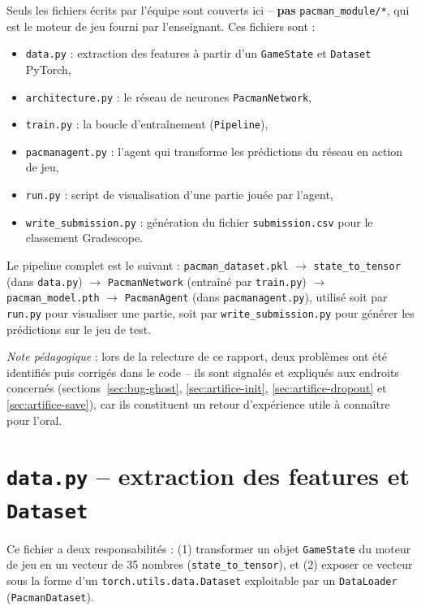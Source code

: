 \documentclass[a4paper,12pt]{article}
\begin{document}
Seuls les fichiers écrits par l'équipe sont couverts ici -- \textbf{pas}
\texttt{pacman\_module/*}, qui est le moteur de jeu fourni par
l'enseignant. Ces fichiers sont :

\begin{itemize}
    \item \texttt{data.py} : extraction des features à partir d'un
    \texttt{GameState} et \texttt{Dataset} PyTorch,
    \item \texttt{architecture.py} : le réseau de neurones
    \texttt{PacmanNetwork},
    \item \texttt{train.py} : la boucle d'entraînement (\texttt{Pipeline}),
    \item \texttt{pacmanagent.py} : l'agent qui transforme les prédictions
    du réseau en action de jeu,
    \item \texttt{run.py} : script de visualisation d'une partie jouée par
    l'agent,
    \item \texttt{write\_submission.py} : génération du fichier
    \texttt{submission.csv} pour le classement Gradescope.
\end{itemize}

Le pipeline complet est le suivant :
\texttt{pacman\_dataset.pkl} $\rightarrow$ \texttt{state\_to\_tensor}
(dans \texttt{data.py}) $\rightarrow$ \texttt{PacmanNetwork} (entraîné par
\texttt{train.py}) $\rightarrow$ \texttt{pacman\_model.pth}
$\rightarrow$ \texttt{PacmanAgent} (dans \texttt{pacmanagent.py}), utilisé
soit par \texttt{run.py} pour visualiser une partie, soit par
\texttt{write\_submission.py} pour générer les prédictions sur le jeu de
test.

\emph{Note pédagogique} : lors de la relecture de ce rapport, deux
problèmes ont été identifiés puis corrigés dans le code -- ils sont
signalés et expliqués aux endroits concernés (sections~\ref{sec:bug-ghost},
\ref{sec:artifice-init}, \ref{sec:artifice-dropout} et
\ref{sec:artifice-save}), car ils constituent un retour d'expérience utile
à connaître pour l'oral.

\newpage
\section{\texttt{data.py} -- extraction des features et \texttt{Dataset}}

Ce fichier a deux responsabilités : (1) transformer un objet
\texttt{GameState} du moteur de jeu en un vecteur de 35 nombres
(\texttt{state\_to\_tensor}), et (2) exposer ce vecteur sous la forme d'un
\texttt{torch.utils.data.Dataset} exploitable par un \texttt{DataLoader}
(\texttt{PacmanDataset}).
\end{document}
